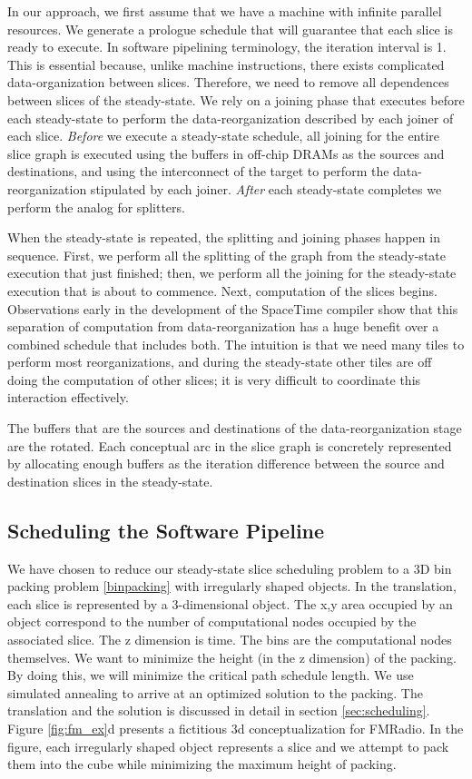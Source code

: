 In our approach, we first assume that we have a machine with infinite
parallel resources.  We generate a prologue schedule that will
guarantee that each slice is ready to execute.  In software pipelining
terminology, the iteration interval is 1.  This is essential because,
unlike machine instructions, there exists complicated
data-organization between slices.  Therefore, we need to remove all
dependences between slices of the steady-state.  We rely on a joining
phase that executes before each steady-state to perform the
data-reorganization described by each joiner of each slice.  {\it
Before} we execute a steady-state schedule, all joining for the entire
slice graph is executed using the buffers in off-chip DRAMs as the
sources and destinations, and using the interconnect of the target to
perform the data-reorganization stipulated by each joiner.  {\it
After} each steady-state completes we perform the analog for
splitters.

When the steady-state is repeated, the splitting and joining phases
happen in sequence.  First, we perform all the splitting of the graph
from the steady-state execution that just finished; then, we perform
all the joining for the steady-state execution that is about to
commence. Next, computation of the slices begins.  Observations early
in the development of the SpaceTime compiler show that this separation
of computation from data-reorganization has a huge benefit over a
combined schedule that includes both.  The intuition is that we need
many tiles to perform most reorganizations, and during the
steady-state other tiles are off doing the computation of other
slices; it is very difficult to coordinate this interaction
effectively.

The buffers that are the sources and destinations of the
data-reorganization stage are the rotated.  Each conceptual arc in the
slice graph is concretely represented by allocating enough buffers as
the iteration difference between the source and destination slices in
the steady-state.

\subsection{Scheduling the Software Pipeline}
We have chosen to reduce our steady-state slice scheduling problem to
a 3D bin packing problem \ref{binpacking} with irregularly shaped
objects.  In the translation, each slice is represented by a
3-dimensional object.  The x,y area occupied by an object correspond
to the number of computational nodes occupied by the associated
slice. The z dimension is time.  The bins are the computational nodes
themselves.  We want to minimize the height (in the z dimension) of
the packing.  By doing this, we will minimize the critical path
schedule length.  We use simulated annealing to arrive at an optimized
solution to the packing.  The translation and the solution is
discussed in detail in section \ref{sec:scheduling}. Figure
\ref{fig:fm_ex}d presents a fictitious 3d conceptualization for
FMRadio. In the figure, each irregularly shaped object represents a
slice and we attempt to pack them into the cube while minimizing the
maximum height of packing.

